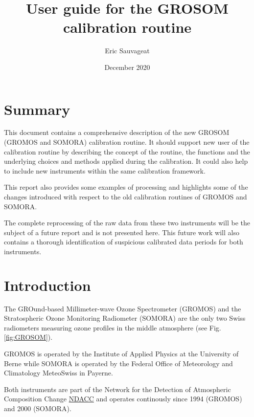 \documentclass[12pt,a4paper,english,titlepage,twoside]{article}
\title{User guide for the GROSOM calibration routine}
\author{Eric Sauvageat}
\date{December 2020}
\begin{document}
\maketitle

\section*{Summary}

This document contains a comprehensive description of the new GROSOM (GROMOS and SOMORA) calibration
routine. It should support new user of the calibration routine by describing the concept of the
routine, the functions and the underlying choices and methods applied during the calibration. It
could also help to include new instruments within the same calibration framework. 

This report also provides some examples of processing and highlights some of the changes introduced
with respect to the old calibration routines of GROMOS and SOMORA.

The complete reprocessing of the raw data from these two instruments will be the subject of a future
report and is not presented here. This future work will also contains a thorough identification of
suspicious calibrated data periods for both instruments.


\tableofcontents
\newpage



\section{Introduction}

The GROund-based Millimeter-wave Ozone Spectrometer (GROMOS) and the Stratospheric Ozone Monitoring
Radiometer (SOMORA) are the only two Swiss radiometers measuring ozone profiles in the middle atmosphere (see Fig. \ref{fig:GROSOM}).

GROMOS is operated by the Institute of Applied Physics at the University of Berne while SOMORA is
operated by the Federal Office of Meteorology and Climatology MeteoSwiss in Payerne. 

Both instruments are part of the Network for the Detection of Atmospheric Composition Change
\href{http://www.ndaccdemo.org/}{NDACC} and operates continously since 1994 (GROMOS) and 2000 (SOMORA). 
\end{document}
